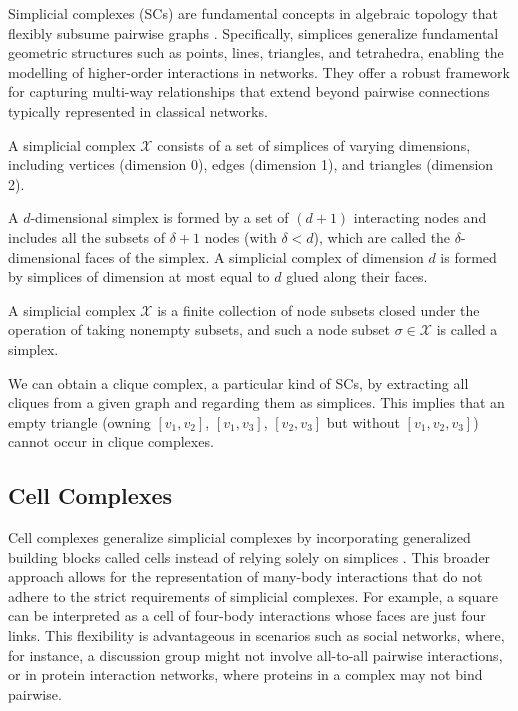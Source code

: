 Simplicial complexes (SCs) are fundamental concepts in algebraic topology that flexibly subsume pairwise graphs \cite{Top_Hodge_Hatcher+2001}. 
Specifically, simplices generalize fundamental geometric structures such as points, lines, triangles, and tetrahedra, enabling the modelling of higher-order interactions in networks. They offer a robust framework for capturing multi-way relationships that extend beyond pairwise connections typically represented in classical networks.

A simplicial complex $\mathcal{X}$ consists of a set of simplices of varying dimensions, including vertices (dimension 0), edges (dimension 1), and triangles (dimension 2).

A $d$-dimensional simplex is formed by a set of $(d+1)$ interacting nodes and includes all the subsets of $\delta + 1$ nodes (with $\delta<d$), which are called the $\delta$-dimensional faces of the simplex.
A simplicial complex of dimension $d$ is formed by simplices of dimension at most equal to $d$ glued along their faces.


\begin{definition}
A simplicial complex $\mathcal{X}$ is a finite collection of node subsets closed under the operation of taking nonempty subsets, and such a node subset $\sigma \in \mathcal{X}$ is called a simplex. 
\end{definition}


We can obtain a clique complex, a particular kind of SCs, by extracting all cliques from a given graph and regarding them as simplices. 
%
This implies that an empty triangle (owning $\left[v_1,v_2\right]$, $\left[v_1,v_3\right]$, $\left[v_2,v_3\right]$ but without $\left[v_1,v_2,v_3\right]$) cannot occur in clique complexes.

\subsection{Cell Complexes}


Cell complexes generalize simplicial complexes by incorporating generalized building blocks called cells instead of relying solely on simplices \cite{Top_Hodge_Hatcher+2001}.
This broader approach allows for the representation of many-body interactions that do not adhere to the strict requirements of simplicial complexes.
For example, a square can be interpreted as a cell of four-body interactions whose faces are just four links. 
This flexibility is advantageous in scenarios such as social networks, where, for instance, a discussion group might not involve all-to-all pairwise interactions, or in protein interaction networks, where proteins in a complex may not bind pairwise.

